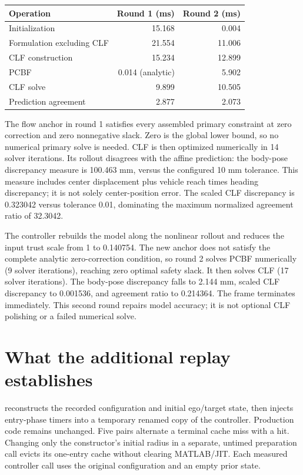 \documentclass[11pt]{article}
\begin{document}
\begin{center}
\begin{tabular}{lrr}
\toprule
Operation & Round 1 (ms) & Round 2 (ms) \\
\midrule
Initialization & 15.168 & 0.004 \\
Formulation excluding CLF & 21.554 & 11.006 \\
CLF construction & 15.234 & 12.899 \\
PCBF & 0.014 (analytic) & 5.902 \\
CLF solve & 9.899 & 10.505 \\
Prediction agreement & 2.877 & 2.073 \\
\bottomrule
\end{tabular}
\end{center}
The flow anchor in round 1 satisfies every assembled primary constraint at
zero correction and zero nonnegative slack. Zero is the global lower bound,
so no numerical primary solve is needed. CLF is then optimized numerically
in 14 solver iterations. Its rollout disagrees with the affine prediction:
the body-pose discrepancy measure is 100.463 mm, versus the configured
10 mm tolerance. This measure includes center displacement plus vehicle
reach times heading discrepancy; it is not solely center-position error.
The scaled CLF discrepancy is 0.323042 versus tolerance 0.01, dominating the
maximum normalized agreement ratio of 32.3042.

The controller rebuilds the model along the nonlinear rollout and reduces
the input trust scale from 1 to 0.140754. The new anchor does not satisfy the
complete analytic zero-correction condition, so round 2 solves PCBF
numerically (9 solver iterations), reaching zero optimal safety slack. It
then solves CLF (17 solver iterations). The body-pose discrepancy falls to
2.144 mm, scaled CLF discrepancy to 0.001536, and agreement ratio to
0.214364. The frame terminates immediately. This second round repairs model
accuracy; it is not optional CLF polishing or a failed numerical solve.

\section{What the additional replay establishes}
 reconstructs the recorded
configuration and initial ego/target state, then injects entry-phase timers
into a temporary renamed copy of the controller. Production code remains
unchanged. Five pairs alternate a terminal cache miss with a hit. Changing
only the constructor's initial radius in a separate, untimed preparation
call evicts its one-entry cache without clearing MATLAB/JIT. Each measured
controller call uses the original configuration and an empty prior state.
\end{document}
